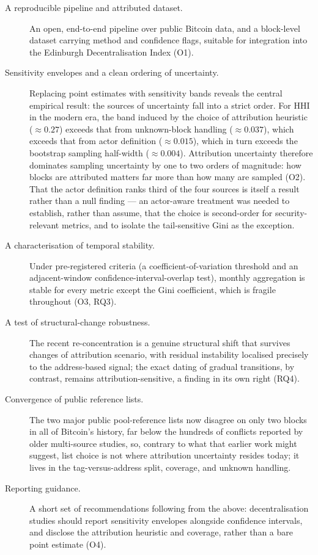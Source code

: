 \documentclass[logo,msc]{infthesis}           %
\begin{document}
\begin{description}
  \item[A reproducible pipeline and attributed dataset.] An open, end-to-end
    pipeline over public Bitcoin data, and a block-level dataset carrying
    method and confidence flags, suitable for integration into the Edinburgh
    Decentralisation Index (O1).
  \item[Sensitivity envelopes and a clean ordering of uncertainty.] Replacing
    point estimates with sensitivity bands reveals the central empirical
    result: the sources of uncertainty fall into a strict order. For HHI in the
    modern era, the band induced by the choice of attribution heuristic
    ($\approx 0.27$) exceeds that from unknown-block handling ($\approx
    0.037$), which exceeds that from actor definition ($\approx 0.015$), which
    in turn exceeds the bootstrap sampling half-width ($\approx 0.004$).
    Attribution uncertainty therefore dominates sampling uncertainty by one to
    two orders of magnitude: how blocks are attributed matters far more than
    how many are sampled (O2). That the actor definition ranks third of the
    four sources is itself a result rather than a null finding --- an
    actor-aware treatment was needed to establish, rather than assume, that the
    choice is second-order for security-relevant metrics, and to isolate the
    tail-sensitive Gini as the exception.
  \item[A characterisation of temporal stability.] Under pre-registered
    criteria (a coefficient-of-variation threshold and an adjacent-window
    confidence-interval-overlap test), monthly aggregation is stable for every
    metric except the Gini coefficient, which is fragile throughout (O3, RQ3).
  \item[A test of structural-change robustness.] The recent
    re-concentration is a genuine structural shift that survives changes of
    attribution scenario, with residual instability localised precisely to the
    address-based signal; the exact dating of gradual transitions, by contrast,
    remains attribution-sensitive, a finding in its own right (RQ4).
  \item[Convergence of public reference lists.] The two major public
    pool-reference lists now disagree on only two blocks in all of Bitcoin's
    history, far below the hundreds of conflicts reported by older
    multi-source studies, so, contrary to what that earlier work might
    suggest, list choice is not where attribution uncertainty resides today; it
    lives in the tag-versus-address split, coverage, and unknown handling.
  \item[Reporting guidance.] A short set of recommendations following from the
    above: decentralisation studies should report sensitivity envelopes
    alongside confidence intervals, and disclose the attribution heuristic and
    coverage, rather than a bare point estimate (O4).
\end{description}
 
\end{document}
